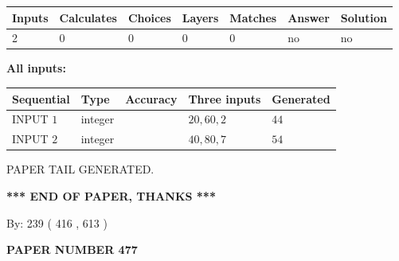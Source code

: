 \documentclass[12pt]{article}
\begin{document}
   
   
   
\noindent\begin{tabular}{|l|l|l|l|l|l|l|}
 \hline
Inputs & Calculates & Choices & Layers & Matches & Answer & Solution \\ \hline
 2  & 
 0  & 
 0
  & 
 0  & 
 0  & 
  no & 
  no 
  \\ \hline
 \end{tabular}
   
   
   
   
\noindent{}
   
   
   
   
\noindent\vspace{0.1in}\hspace{-0.08in} {\textbf{\Large{All inputs: }}}
   
   
  
  
\noindent\begin{tabular}{|l|l|l|l|l|}
\hline
 Sequential & Type & Accuracy & Three inputs & Generated \\ 
\hline
 
 
  INPUT $  1 $ & integer &  & $
 20
 , 
 60
 , 
 2
 $ & $ 44 $ 
 \\  \hline  
 
 
  INPUT $  2 $ & integer &  & $
 40
 , 
 80
 , 
 7
 $ & $ 54 $ 
 \\  \hline  
 \end{tabular}
   
   
   
   
   
   
 \vspace{0.2in}
 
   
   
\vspace{2.0in} PAPER TAIL GENERATED.
   
   
   
   
\vspace{1.0in} 
{\textbf{\large{ *** END OF PAPER, THANKS *** }}} 
   
   
\hspace{1.0in} By: 
 239 ( 416 ,  613 )
   
   
   
   
\newpage 
\setcounter{page}{ 
   477001 } 
   
   
   
   
 {\textbf{ \Large{ PAPER NUMBER  477  }}}
   
\end{document}
